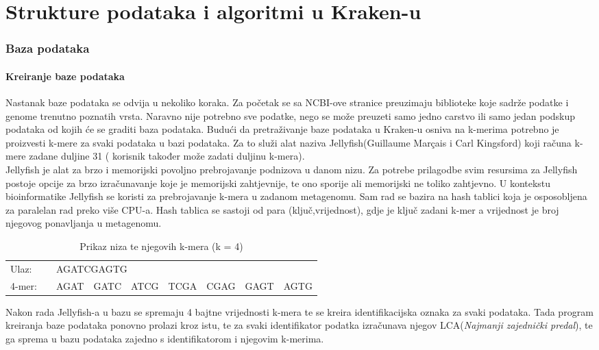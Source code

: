 \documentclass[times, utf8, zavrsni]{fer}
\begin{document}
{\chapter{Strukture podataka i algoritmi u Kraken-u}
\subsection{Baza podataka}
\subsubsection{Kreiranje baze podataka}

Nastanak baze podataka se odvija u nekoliko koraka. Za početak se sa NCBI-ove stranice preuzimaju biblioteke koje sadrže podatke i genome trenutno poznatih vrsta. Naravno nije potrebno sve podatke, nego se može preuzeti samo jedno carstvo ili samo jedan podskup podataka od kojih će se graditi baza podataka. Budući da pretraživanje baze podataka u Kraken-u osniva na k-merima potrebno je proizvesti k-mere za svaki podataka u bazi podataka. Za to služi alat naziva Jellyfish(Guillaume Marçais i Carl Kingsford) koji računa k-mere zadane duljine 31 ( korisnik također može zadati duljinu k-mera).\\Jellyfish je alat za brzo i memorijski povoljno prebrojavanje podnizova u danom nizu. Za potrebe prilagodbe svim resursima za Jellyfish postoje opcije za brzo izračunavanje koje je memorijski zahtjevnije, te ono sporije ali memorijski ne toliko zahtjevno. U kontekstu bioinformatike Jellyfish se koristi za prebrojavanje k-mera u zadanom metagenomu. Sam rad se bazira na hash tablici koja je osposobljena za paralelan rad preko više CPU-a. Hash tablica se sastoji od para (ključ,vrijednost), gdje je ključ zadani k-mer a vrijednost je broj njegovog ponavljanja u metagenomu.
	 	
\begin{table}[hbp]
	\centering
	\caption{Prikaz niza te njegovih k-mera (k = 4)}
	\label{Prikaz k-mera}
	\begin{tabular}{llllllllll}
		Ulaz:  &           & \multicolumn{8}{l}{AGATCGAGTG}                            \\
		4-mer: & \multicolumn{2}{l}{} & AGAT & GATC & ATCG & TCGA & CGAG & GAGT & AGTG
	\end{tabular}
\end{table}
Nakon rada Jellyfish-a u bazu se spremaju 4 bajtne vrijednosti k-mera te se kreira identifikacijska oznaka za svaki podataka. Tada program kreiranja baze podataka ponovno prolazi kroz istu, te za svaki identifikator podatka izračunava njegov LCA(\textit{Najmanji zajednički predal}), te ga sprema u bazu podataka zajedno s identifikatorom i njegovim k-merima.
}
\end{document}
